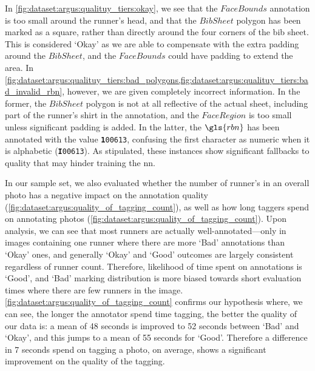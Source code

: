 In \cref{fig:dataset:argus:qualituy_tiers:okay}, we see that the $FaceBounds$ annotation is too small around the runner's head, and that the $BibSheet$ polygon has been marked as a square, rather than directly around the four corners of the bib sheet. This is considered `Okay' as we are able to compensate with the extra padding around the $BibSheet$, and the $FaceBounds$ could have padding to extend the area. In \cref{fig:dataset:argus:qualituy_tiers:bad_polygons,fig:dataset:argus:qualituy_tiers:bad_invalid_rbn}, however, we are given completely incorrect information. In the former, the $BibSheet$ polygon is not at all reflective of the actual sheet, including part of the runner's shirt in the annotation, and the $FaceRegion$ is too small unless significant padding is added. In the latter, the $\gls{rbn}$ has been annotated with the value \texttt{\textbf{1}00613}, confusing the first character as numeric when it is alphabetic (\texttt{\textbf{I}00613}). As stipulated, these instances show significant fallbacks to quality that may hinder training the \gls{nn}.

In our sample set, we also evaluated whether the number of runner's in an overall photo has a negative impact on the annotation quality (\cref{fig:dataset:argus:quality_of_tagging_count}), as well as how long taggers spend on annotating photos (\cref{fig:dataset:argus:quality_of_tagging_count}). Upon analysis, we can see that most runners are actually well-annotated---only in images containing one runner where there are more `Bad' annotations than `Okay' ones, and generally `Okay' and `Good' outcomes are largely consistent regardless of runner count. Therefore, likelihood of time spent on annotations is `Good', and `Bad' marking distribution is more biased towards short evaluation times where there are few runners in the image. \cref{fig:dataset:argus:quality_of_tagging_count} confirms our hypothesis where, we can see, the longer the annotator spend time tagging, the better the quality of our data is: a mean of 48 seconds is improved to 52 seconds between `Bad' and `Okay', and this jumps to a mean of 55 seconds for `Good'. Therefore a difference in 7 seconds spend on tagging a photo, on average, shows a significant improvement on the quality of the tagging.

\clearpage

